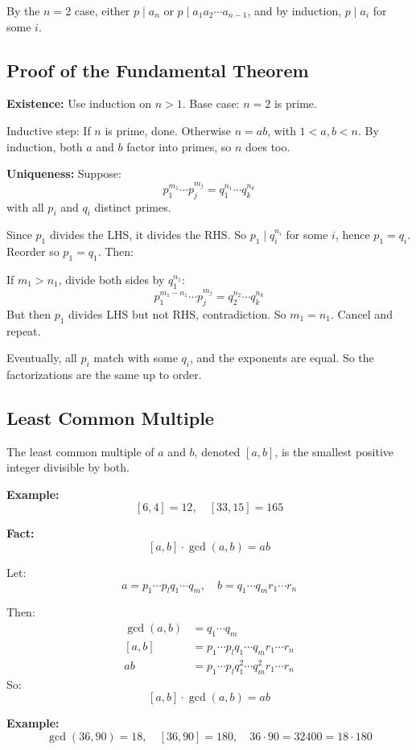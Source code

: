 By the $n=2$ case, either $p \mid a_n$ or $p \mid a_1a_2 \cdots a_{n-1}$, and by induction, $p \mid a_i$ for some $i$.

\subsection{Proof of the Fundamental Theorem}

\textbf{Existence:}  
Use induction on $n > 1$.  
Base case: $n = 2$ is prime.

Inductive step: If $n$ is prime, done. Otherwise $n = ab$, with $1 < a, b < n$.  
By induction, both $a$ and $b$ factor into primes, so $n$ does too.

\textbf{Uniqueness:}  
Suppose:
\[
p_1^{m_1} \cdots p_j^{m_j} = q_1^{n_1} \cdots q_k^{n_k}
\]
with all $p_i$ and $q_i$ distinct primes.

Since $p_1$ divides the LHS, it divides the RHS. So $p_1 \mid q_i^{n_i}$ for some $i$, hence $p_1 = q_i$.  
Reorder so $p_1 = q_1$. Then:

If $m_1 > n_1$, divide both sides by $q_1^{n_1}$:
\[
p_1^{m_1-n_1} \cdots p_j^{m_j} = q_2^{n_2} \cdots q_k^{n_k}
\]
But then $p_1$ divides LHS but not RHS, contradiction. So $m_1 = n_1$. Cancel and repeat.

Eventually, all $p_i$ match with some $q_i$, and the exponents are equal. So the factorizations are the same up to order.

\subsection{Least Common Multiple}

The least common multiple of $a$ and $b$, denoted $[a, b]$, is the smallest positive integer divisible by both.  

\textbf{Example:}
\[
[6, 4] = 12, \quad [33, 15] = 165
\]

\textbf{Fact:}
\[
[a, b] \cdot \gcd(a, b) = ab
\]

Let:
\[
a = p_1 \cdots p_lq_1 \cdots q_m, \quad b = q_1 \cdots q_mr_1 \cdots r_n
\]

Then:
\begin{align*}
\gcd(a, b) &= q_1 \cdots q_m \\
[a, b] &= p_1 \cdots p_lq_1 \cdots q_mr_1 \cdots r_n \\
ab &= p_1 \cdots p_lq_1^2 \cdots q_m^2r_1 \cdots r_n
\end{align*}
So:
\[
[a, b] \cdot \gcd(a, b) = ab
\]

\textbf{Example:}  
\[
\gcd(36, 90) = 18, \quad [36, 90] = 180, \quad 36 \cdot 90 = 32400 = 18 \cdot 180
\]

\newpage
